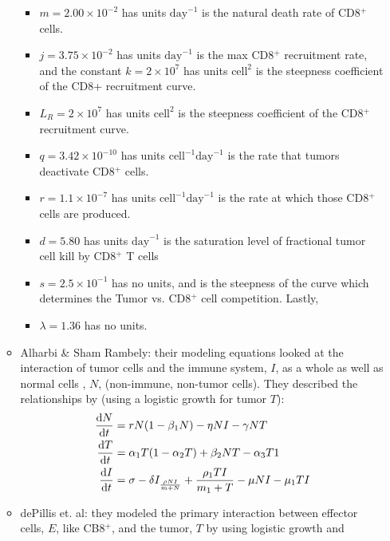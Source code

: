 \documentclass[11pt]{amsart}
\begin{document}
\begin{itemize}
\begin{itemize}
\begin{itemize}
                   		 	\item $m = 2.00 \times 10^{-2}$ has units $\text{day}^{-1}$ is the natural death rate of CD8$^+$ cells.
                   		 	\item $j = 3.75 \times 10^{-2}$ has units $\text{day}^{-1}$ is the max CD8$^+$ recruitment rate, and the constant $k = 2 \times 10^7$ has units $\text{cell}^2$ is the steepness coefficient of the CD8+ recruitment curve.
                   		 	\item $L_R = 2 \times 10^7$ has units $\text{cell}^2$ is the steepness coefficient of the CD8$^+$ recruitment curve.
                   		 	\item $q = 3.42 \times 10^{-10}$ has units $\text{cell}^{-1}\text{day}^{-1}$ is the rate that tumors deactivate CD8$^+$ cells.
                   		 	\item $r =1.1 \times 10^{-7} $ has units $\text{cell}^{-1}\text{day}^{-1}$ is the rate at which those CD8$^+$ cells are produced. 
                    			\item $d = 5.80$ has units $\text{day}^{-1}$ is the saturation level of fractional tumor cell kill by CD8$^+$ T cells
                    			\item $s = 2.5 \times 10^{-1}$ has no units, and is the steepness of the curve which determines the Tumor vs. CD8$^+$ cell competition. Lastly, \item $\lambda = 1.36$ has no units. 
				\end{itemize}
			\item Alharbi \& Sham Rambely: their modeling equations looked at the interaction of tumor cells and the immune system, $I$, as a whole as well as normal cells , $N$, (non-immune, non-tumor cells). They described the relationships by (using a logistic growth for tumor $T$):
				\begin{eqnarray}
					\begin{aligned}
						\frac{\mathop{}\!\mathrm{d} N}{\mathop{}\!\mathrm{d} t} &= rN(1-\beta_1 N) - \eta NI - \gamma NT \\
						\frac{\mathop{}\!\mathrm{d} T}{\mathop{}\!\mathrm{d} t} &= \alpha_1T(1-\alpha_2T) + \beta_2 NT - \alpha_3 T1 \\
						\frac{\mathop{}\!\mathrm{d} I}{\mathop{}\!\mathrm{d} t} &= \sigma - \delta I _ \frac{\rho N I}{m+N} + \frac{\rho_1 TI}{m_1 + T} - \mu NI - \mu_1 TI \label{eq: AlharbiTumorImmuno}
					\end{aligned}
				\end{eqnarray}
			\item dePillis et. al: they modeled the primary interaction between effector cells, $E$, like CB8$^+$, and the tumor, $T$ by using logistic growth and 

\end{itemize}
\end{itemize}
\end{document}
